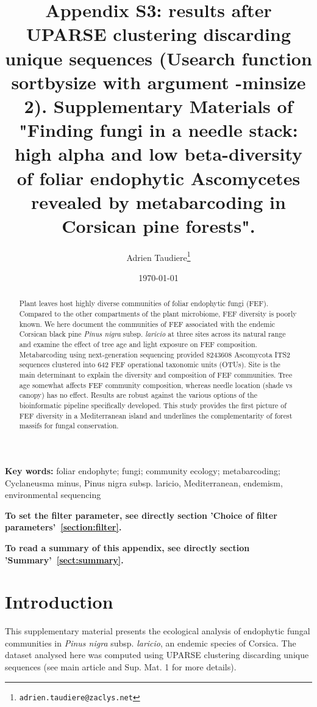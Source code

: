 \documentclass[12pt]{article}\usepackage[]{graphicx}\usepackage[]{color}
\title{Appendix S3: results after UPARSE clustering discarding unique sequences (Usearch function sortbysize with argument -minsize 2). Supplementary Materials of "Finding fungi in a needle stack: high alpha and low beta-diversity of foliar endophytic Ascomycetes revealed by metabarcoding in Corsican pine forests".}
\author{Adrien Taudiere\thanks{\texttt{adrien.taudiere@zaclys.net}}}
\affil{{\footnotesize CEFE - Centre d'Ecologie Fonctionnelle et Evolutive, Montpellier: France}}
\date{\today}
\numberwithin{figure}{section}
\begin{document}






\maketitle

\begin{abstract}

Plant leaves host highly diverse communities of foliar endophytic fungi (FEF). Compared to the other compartments of the plant microbiome, FEF diversity is poorly known. We here document the communities of FEF associated with the endemic Corsican black pine \textit{Pinus nigra} subsp. \textit{laricio} at three sites across its natural range and examine the effect of tree age and light exposure on FEF composition. Metabarcoding using next-generation sequencing provided 8243608 Ascomycota ITS2 sequences clustered into 642 FEF operational taxonomic units (OTUs). Site is the main determinant to explain the diversity and composition of FEF communities. Tree age somewhat affects FEF community composition, whereas needle location (shade vs canopy) has no effect. Results are robust against the various options of the bioinformatic pipeline specifically developed. This study provides the first picture of FEF diversity in a Mediterranean island and underlines the complementarity of forest massifs for fungal conservation.

\end{abstract}


\textbf{Key words:} foliar endophyte; fungi; community ecology; metabarcoding; Cyclaneusma minus, Pinus nigra subsp. laricio, Mediterranean, endemism, environmental sequencing


\vfill
\begin{center}
\textbf{To set the filter parameter, see directly section 'Choice of filter parameters'~\ref{section:filter}.}

\textbf{To read a summary of this appendix, see directly section 'Summary'~\ref{sect:summary}.}
\end{center}

\newpage
\tableofcontents
\newpage


\section{Introduction}

This supplementary material presents the ecological analysis of endophytic fungal communities in \textit{Pinus nigra} subsp. \textit{laricio}, an endemic species of Corsica. The dataset analysed here was computed using UPARSE clustering discarding unique sequences (see main article and Sup. Mat. 1 for more details).
\end{document}

